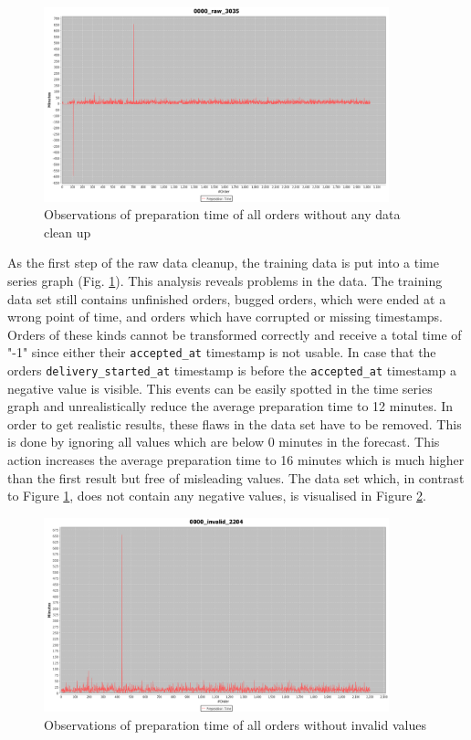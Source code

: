 \begin{figure}[h]
\begin{center}
\includegraphics[width=10cm]{images/0000_raw_3035.png}
\caption{Observations of preparation time of all orders without any data clean up}
\label{fig:0000_raw_3035}
\end{center}
\end{figure}

As the first step of the raw data cleanup, the training data is put into a time series graph (Fig. \ref{fig:0000_raw_3035}). This analysis reveals problems in the data. The training data set still contains unfinished orders, bugged orders, which were ended at a wrong point of time, and orders which have corrupted or missing timestamps. Orders of these kinds cannot be transformed correctly and receive a total time of "-1" since either their \texttt{accepted\_at} timestamp is not usable. In case that the orders \texttt{delivery\_started\_at} timestamp is before the \texttt{accepted\_at} timestamp a negative value is visible. This events can be easily spotted in the time series graph and unrealistically reduce the average preparation time to 12 minutes. In order to get realistic results, these flaws in the data set have to be removed. This is done by ignoring all values which are below 0 minutes in the forecast. This action increases the average preparation time to 16 minutes which is much higher than the first result but free of misleading values. The data set which, in contrast to Figure \ref{fig:0000_raw_3035}, does not contain any negative values, is visualised in Figure \ref{fig:0000_invalid_2204}.

\begin{figure}[h]
\begin{center}
\includegraphics[width=10cm]{images/0000_invalid_2204.png}
\caption{Observations of preparation time of all orders without invalid values}
\label{fig:0000_invalid_2204}
\end{center}
\end{figure}

